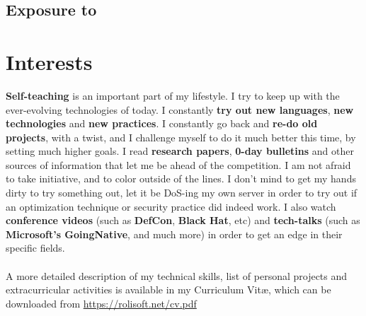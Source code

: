 \documentclass[11pt,a4paper,sans]{moderncv}
\begin{document}
		
	\subsection{Exposure to}
	

\section{Interests}
	\textbf{Self-teaching} is an important part of my lifestyle. I try to keep up with the ever-evolving technologies of today. I constantly \textbf{try out new languages}, \textbf{new technologies} and \textbf{new practices}. I constantly go back and \textbf{re-do old projects}, with a twist, and I challenge myself to do it much better this time, by setting much higher goals. I read \textbf{research papers}, \textbf{0-day bulletins} and other sources of information that let me be ahead of the competition. I am not afraid to take initiative, and to color outside of the lines. I don't mind to get my hands dirty to try something out, let it be DoS-ing my own server in order to try out if an optimization technique or security practice did indeed work. I also watch \textbf{conference videos} (such as \textbf{DefCon}, \textbf{Black Hat}, etc) and \textbf{tech-talks} (such as \textbf{Microsoft's GoingNative}, and much more) in order to get an edge in their specific fields.
	\\\\
	{\color{color2} A more detailed description of my technical skills, list of personal projects and extracurricular activities is available in my Curriculum Vitæ, which can be downloaded from}
	{\color{color1} \url{https://rolisoft.net/cv.pdf}}
	
\end{document}
